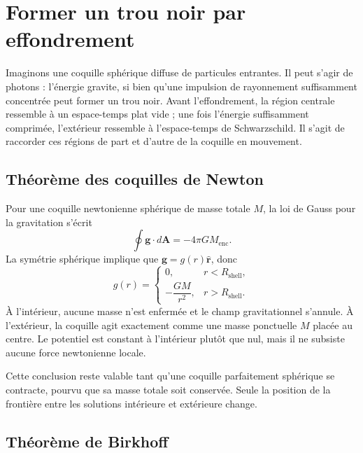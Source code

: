 \section{Former un trou noir par effondrement}

Imaginons une coquille sphérique diffuse de particules entrantes. Il peut s’agir de photons : l’énergie gravite, si bien qu’une impulsion de rayonnement suffisamment concentrée peut former un trou noir. Avant l’effondrement, la région centrale ressemble à un espace-temps plat vide ; une fois l’énergie suffisamment comprimée, l’extérieur ressemble à l’espace-temps de Schwarzschild. Il s’agit de raccorder ces régions de part et d’autre de la coquille en mouvement.

\subsection{Théorème des coquilles de Newton}

Pour une coquille newtonienne sphérique de masse totale \(M\), la loi de Gauss pour la gravitation s’écrit
\begin{equation}
\oint \mathbf{g}\cdot d\mathbf{A}=-4\pi G M_{\mathrm{enc}}.
\label{eq:l04-gauss-gravity}
\end{equation}
La symétrie sphérique implique que \(\mathbf{g}=g(r)\hat{\mathbf r}\), donc
\begin{equation}
g(r)=
\begin{cases}
0, & r<R_{\mathrm{shell}},\\[4pt]
-\dfrac{GM}{r^2}, & r>R_{\mathrm{shell}}.
\end{cases}
\label{eq:l04-shell-field}
\end{equation}
À l’intérieur, aucune masse n’est enfermée et le champ gravitationnel s’annule. À l’extérieur, la coquille agit exactement comme une masse ponctuelle \(M\) placée au centre. Le potentiel est constant à l’intérieur plutôt que nul, mais il ne subsiste aucune force newtonienne locale.

Cette conclusion reste valable tant qu’une coquille parfaitement sphérique se contracte, pourvu que sa masse totale soit conservée. Seule la position de la frontière entre les solutions intérieure et extérieure change.

\subsection{Théorème de Birkhoff}

